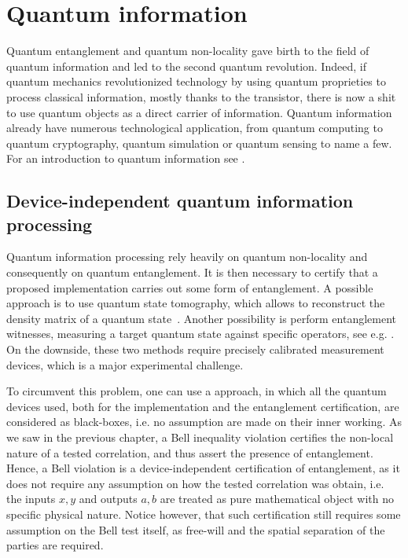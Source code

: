 \chapter{Quantum information}

Quantum entanglement and quantum non-locality gave birth to the field of quantum information and led to the second quantum revolution.
Indeed, if quantum mechanics revolutionized technology by using quantum proprieties to process classical information, mostly thanks to the transistor, there is now a shit to use quantum objects as a direct carrier of information.
Quantum information already have numerous technological application, from quantum computing to quantum cryptography, quantum simulation or quantum sensing to name a few.
For an introduction to quantum information see \cite{Nielsen2012}.

\section{Device-independent quantum information processing}

Quantum information processing rely heavily on quantum non-locality and consequently on quantum entanglement.
It is then necessary to certify that a proposed implementation carries out some form of entanglement.
A possible approach is to use quantum state tomography, which allows to reconstruct the density matrix of a quantum state~\cite{MauroDAriano2003}.
Another possibility is perform entanglement witnesses, measuring a target quantum state against specific operators, see e.g. \cite{Bru2002}.
On the downside, these two methods require precisely calibrated measurement devices, which is a major experimental challenge.

To circumvent this problem, one can use a  approach, in which all the quantum devices used, both for the implementation and the entanglement certification, are considered as black-boxes, i.e. no assumption are made on their inner working.
As we saw in the previous chapter, a Bell inequality violation certifies the non-local nature of a tested correlation, and thus assert the presence of entanglement.
Hence, a Bell violation is a device-independent certification of entanglement, as it does not require any assumption on how the tested correlation was obtain, i.e. the inputs $x,y$ and outputs $a,b$ are treated as pure mathematical object with no specific physical nature.
Notice however, that such certification still requires some assumption on the Bell test itself, as free-will and the spatial separation of the parties are required.

